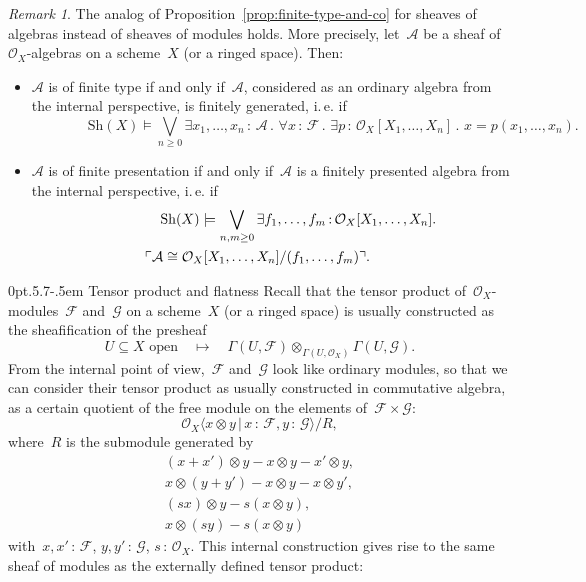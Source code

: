 \documentclass[10pt,reqno,a4paper]{amsbook}
\makeatletter
\theoremstyle{definition}
\theoremstyle{plain}
\theoremstyle{remark}
\newtheorem{rem}[defn]{Remark}
\newcommand{\A}{\mathcal{A}}
\newcommand{\F}{\mathcal{F}}
\renewcommand{\G}{\mathcal{G}}
\renewcommand{\O}{\mathcal{O}}
\newcommand{\Sh}{\mathrm{Sh}}
\newcommand{\?}{\,{:}\,}
\renewcommand{\_}{\mathpunct{.}\,}
\newcommand{\speak}[1]{\ulcorner\text{\textnormal{#1}}\urcorner}
\newcommand{\ie}{i.\,e.\@\xspace}
\def\subsection{\@startsection{subsection}{2}%
  {0pt}{.5\linespacing\@plus.7\linespacing}{-.5em}%
  {\normalfont\bfseries}}
\makeatother
\begin{document}
\begin{rem}The analog of Proposition~\ref{prop:finite-type-and-co} for
sheaves of algebras instead of sheaves of modules holds. More precisely,
let~$\A$ be a sheaf of~$\O_X$-algebras on a scheme~$X$ (or a ringed space).
Then:
\begin{itemize}
\item $\A$ is of finite type if and only if~$\A$, considered as an ordinary
algebra from the internal perspective, is finitely generated, \ie if
\[ {\qquad\qquad} \Sh(X) \models
  \bigvee_{n \geq 0}
  \exists x_1,\ldots,x_n\?\A\_
  \forall x\?\F\_
  \exists p\?\O_X[X_1,\ldots,X_n]\_
  x = p(x_1,\ldots,x_n). \]
\item $\A$ is of finite presentation if and only if~$\A$ is a finitely
presented algebra from the internal perspective, \ie if
\begin{multline*}
  {\qquad\qquad} \Sh(X) \models \bigvee_{n,m \geq 0}
  \exists f_1,\ldots,f_m \? \O_X[X_1,\ldots,X_n]\_ \\
  \speak{$\A \cong \O_X[X_1,\ldots,X_n]/(f_1,\ldots,f_m)$}. \qquad
\end{multline*}
\end{itemize}
\end{rem}


\subsection{Tensor product and flatness} Recall that the tensor product
of~$\O_X$-modules~$\F$ and~$\G$ on a scheme~$X$ (or a ringed space) is usually
constructed as the sheafification of the presheaf
\[ \text{$U \subseteq X$ open} \quad\longmapsto\quad \Gamma(U,\F) \otimes_{\Gamma(U,\O_X)}
\Gamma(U,\G). \]
From the internal point of view,~$\F$ and~$\G$ look like ordinary modules, so
that we can consider their tensor product as usually constructed in
commutative algebra, as a certain quotient of the free module on the elements
of~$\F \times \G$:
\[ \O_X\langle x \otimes y \,|\, x\?\F, y\?\G \rangle / R, \]
where~$R$ is the submodule generated by
\begin{gather*}
  (x+x') \otimes y - x \otimes y - x' \otimes y, \\
  x \otimes (y+y') - x \otimes y - x \otimes y', \\
  (sx) \otimes y - s(x \otimes y), \\
  x \otimes (sy) - s(x \otimes y)
\end{gather*}
with~$x,x'\?\F$, $y,y'\?\G$, $s\?\O_X$.
This internal construction gives rise to the same sheaf
of modules as the externally defined tensor product:
\end{document}
